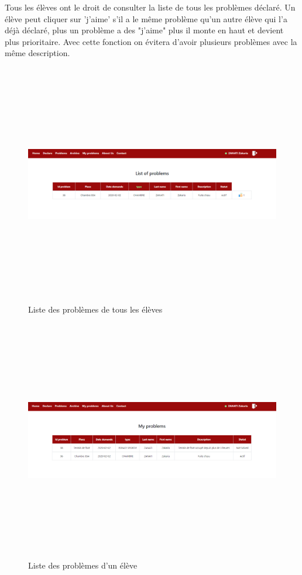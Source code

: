 \documentclass[11.5pt]{report}
\begin{document}
\newpage
Tous les élèves ont le droit de consulter la liste de tous les problèmes déclaré.
Un élève peut cliquer sur 'j'aime' s'il a le même problème qu'un autre élève qui l'a déjà déclaré, plus un problème a des "j'aime" plus il monte en haut et devient plus prioritaire. Avec cette fonction on évitera d'avoir plusieurs problèmes avec la même description.\\
\begin{figure}[h]
	
	\begin{center}
		\includegraphics[width=500pt,height=300pt]{problems-eleve.png} 
		\caption{Liste des problèmes de tous les élèves}
	\end{center}
	
\end{figure}
\newpage
\begin{figure}[h]
	
	\begin{center}
		\includegraphics[width=500pt,height=300pt]{myproblems.png} 
		\caption{Liste des problèmes d'un élève}
	\end{center}
	
\end{figure}
\end{document}
